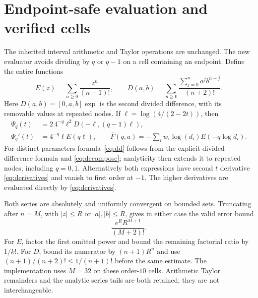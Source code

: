 \documentclass[11pt,reqno]{amsart}
\theoremstyle{remark}\newtheorem{remark}[theorem]{Remark}
\numberwithin{equation}{section}
\begin{document}
\section{Endpoint-safe evaluation and verified cells}
The inherited interval arithmetic and Taylor operations are unchanged.
The new evaluator avoids dividing by $q$ or $q-1$ on a cell containing an
endpoint. Define the entire functions
\[
 E(z)=\sum_{n\ge0}\frac{z^n}{(n+1)!},\qquad
 D(a,b)=\sum_{n\ge0}\frac{\sum_{j=0}^n a^j b^{n-j}}{(n+2)!}.
\]
Here $D(a,b)=[0,a,b]\exp$ is the second divided difference, with its
removable values at repeated nodes. If $\ell=\log(4/(2-2t))$, then
\begin{align}
 \Psi_q(t)&=2\,4^{-q}\ell^2D(-\ell,(q-1)\ell),\label{eq:dd}\\
 \Psi_q'(t)&=4^{-q}\ell E(q\ell),\qquad
 \overline F(q,a)=-\sum_iw_i\log(d_i)E(-q\log d_i).
\end{align}
For distinct parameters formula~\eqref{eq:dd} follows from the explicit
divided-difference formula and \eqref{eq:decompose}; analyticity then
extends it to repeated nodes, including $q=0,1$. Alternatively both
expressions have second $t$ derivative \eqref{eq:derivatives} and vanish
to first order at $-1$. The higher derivatives are evaluated directly
by \eqref{eq:derivatives}.

Both series are absolutely and uniformly convergent on bounded sets.
Truncating after $n=M$, with $|z|\le R$ or $|a|,|b|\le R$, gives in either
case the valid error bound
\begin{equation}\label{eq:tail}
 \frac{e^R R^{M+1}}{(M+2)!}.
\end{equation}
For $E$, factor the first omitted power and bound the remaining factorial
ratio by $1/k!$. For $D$, bound its numerator by $(n+1)R^n$ and use
$(n+1)/(n+2)!\le1/(n+1)!$ before the same estimate. The implementation
uses $M=32$ on these order-$10$ cells. Arithmetic Taylor remainders and
the analytic series tails are both retained; they are not interchangeable.
\end{document}
